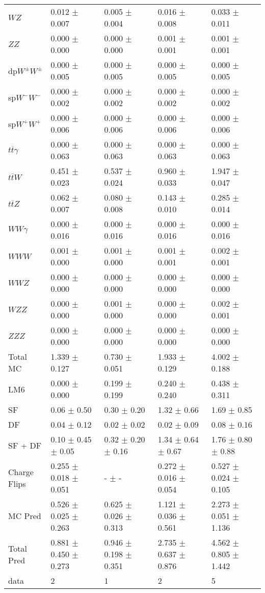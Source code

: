 \begin{tabular}{l | l l l l}
$WZ$ &  0.012 $\pm$  0.007 &  0.005 $\pm$  0.004 &  0.016 $\pm$  0.008 &  0.033 $\pm$  0.011\\
$ZZ$ &   0.000 $\pm$   0.000 &   0.000 $\pm$   0.000 &  0.001 $\pm$  0.001 &  0.001 $\pm$  0.001\\
\hline
dp$W^{\pm}W^{\pm}$ &  0.000 $\pm$  0.005 &  0.000 $\pm$  0.005 &  0.000 $\pm$  0.005 &  0.000 $\pm$  0.005\\
sp$W^{-}W^{-}$ &  0.000 $\pm$  0.002 &  0.000 $\pm$  0.002 &  0.000 $\pm$  0.002 &  0.000 $\pm$  0.002\\
sp$W^{+}W^{+}$ &  0.000 $\pm$  0.006 &  0.000 $\pm$  0.006 &  0.000 $\pm$  0.006 &  0.000 $\pm$  0.006\\
$t\overline{t}\gamma$ &  0.000 $\pm$  0.063 &  0.000 $\pm$  0.063 &  0.000 $\pm$  0.063 &  0.000 $\pm$  0.063\\
$t\overline{t}W$ &  0.451 $\pm$  0.023 &  0.537 $\pm$  0.024 &  0.960 $\pm$  0.033 &  1.947 $\pm$  0.047\\
$t\overline{t}Z$ &  0.062 $\pm$  0.007 &  0.080 $\pm$  0.008 &  0.143 $\pm$  0.010 &  0.285 $\pm$  0.014\\
$WW\gamma$ &  0.000 $\pm$  0.016 &  0.000 $\pm$  0.016 &  0.000 $\pm$  0.016 &  0.000 $\pm$  0.016\\
$WWW$ &  0.001 $\pm$   0.000 &  0.001 $\pm$   0.000 &  0.001 $\pm$  0.001 &  0.002 $\pm$  0.001\\
$WWZ$ &   0.000 $\pm$   0.000 &   0.000 $\pm$   0.000 &  0.000 $\pm$   0.000 &   0.000 $\pm$   0.000\\
$WZZ$ &   0.000 $\pm$   0.000 &  0.001 $\pm$   0.000 &   0.000 $\pm$   0.000 &  0.002 $\pm$  0.001\\
$ZZZ$ &   0.000 $\pm$   0.000 &   0.000 $\pm$   0.000 &   0.000 $\pm$   0.000 &   0.000 $\pm$   0.000\\
\hline
Total MC &  1.339 $\pm$  0.127 &  0.730 $\pm$  0.051 &  1.933 $\pm$  0.129 &  4.002 $\pm$  0.188\\
\hline\hline
\hline
LM6 &  0.000 $\pm$  0.000 &  0.199 $\pm$  0.199 &  0.240 $\pm$  0.240 &  0.438 $\pm$  0.311\\
\hline\hline
\hline\hline
 SF  & 0.06 $\pm$ 0.50 & 0.30 $\pm$ 0.20 & 1.32 $\pm$ 0.66 & 1.69 $\pm$ 0.85\\
 DF  & 0.04 $\pm$ 0.12 & 0.02 $\pm$ 0.02 & 0.02 $\pm$ 0.09 & 0.08 $\pm$ 0.16\\
\hline
 SF + DF  & 0.10 $\pm$ 0.45 $\pm$ 0.05 & 0.32 $\pm$ 0.20 $\pm$ 0.16 & 1.34 $\pm$ 0.64 $\pm$ 0.67 & 1.76 $\pm$ 0.80 $\pm$ 0.88\\
\hline\hline
Charge Flips & 0.255 $\pm$ 0.018 $\pm$ 0.051 & - $\pm$ - & 0.272 $\pm$ 0.016 $\pm$ 0.054 & 0.527 $\pm$ 0.024 $\pm$ 0.105\\
\hline\hline
\hline
MC Pred &  0.526 $\pm$  0.025 $\pm$  0.263 &  0.625 $\pm$  0.026 $\pm$  0.313 &  1.121 $\pm$  0.036 $\pm$  0.561 &  2.273 $\pm$  0.051 $\pm$  1.136\\
\hline\hline
Total Pred &  0.881 $\pm$  0.450 $\pm$  0.273 &  0.946 $\pm$  0.198 $\pm$  0.351 &  2.735 $\pm$  0.637 $\pm$  0.876 &  4.562 $\pm$  0.805 $\pm$  1.442\\
\hline\hline
data & 2 & 1 & 2 & 5\\
\hline\hline
\end{tabular}
